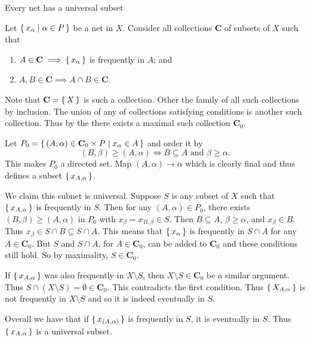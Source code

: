 \documentclass[letterpaper, 11pt]{article}
\begin{document}
\begin{thrm}\label{thrm: net_has_universal_subnet}
  Every net has a universal subset
\end{thrm}
\begin{pf}
  Let $\set{x_{\alpha} | \alpha \in P}$ be a net in $X$.
  Consider all collections \textbf{C} of subsets of $X$ such that
  \begin{enumerate}
  \item $A \in \textbf{C} \implies \set{x_{\alpha}}$ is frequently in $A$; and
  \item $A, B \in \textbf{C} \implies A \cap B \in \textbf{C}$.
  \end{enumerate}
  Note that $\textbf{C} = \set{X}$ is such a collection.
  Other the family of all such collections by inclusion.
  The union of any  of collections satisfying conditions is another such collection.
  Thus by the  there exists a maximal such collection $\textbf{C}_{0}$.

  Let $P_{0} = \set{(A, \alpha) \in \textbf{C}_{0} \times P | x_{\alpha} \in A}$ and order it by
  \[
    (B, \beta) \geq (A, \alpha) \iff B \subseteq A \text{ and } \beta \geq \alpha.
  \]
  This makes $P_{0}$ a directed set.
  Map $(A, \alpha) \to \alpha$ which is clearly final and thus defines a subset $\set{x_{A, \alpha}}$.

  We claim this subnet is universal.
  Suppose $S$ is any subset of $X$ such that $\set{x_{A, \alpha}}$ is frequently in $S$.
  Then for any $(A, \alpha) \in P_{0}$, there exists $(B, \beta) \geq (A, \alpha)$ in $P_{0}$ with $x_{\beta} = x_{B, \beta} \in S$.
  Then $B \subseteq A$, $\beta \geq \alpha$, and $x_{\beta} \in B$.
  Thus $x_{\beta} \in S \cap B \subseteq S \cap A$.
  This means that $\set{x_\alpha}$ is frequently in $S \cap A$ for any $A \in \textbf{C}_{0}$.
  But $S$ and $S \cap A$, for $A \in \textbf{C}_{0}$, can be added to $\textbf{C}_{0}$ and these conditions still hold.
  So by maximality, $S \in \textbf{C}_{0}$.

  If $\set{x_{A, \alpha}}$ was also frequently in $X \setminus S$, then $X \setminus S \in \textbf{C}_{0}$ be a similar argument.
  Thus $S \cap (X \setminus S) = \emptyset \in \textbf{C}_{0}$.
  This contradicts the first condition.
  Thus $\set{X_{A, \alpha}}$ is not frequently in $X \setminus S$ and so it is indeed eventually in $S$.

  Overall we have that if $\set{x_{(A, \alpha)}}$ is frequently in $S$, it is eventually in $S$.
  Thus $\set{x_{A, \alpha}}$ is a universal subset.
\end{pf}
\end{document}
